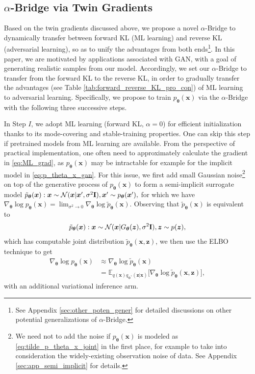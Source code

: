 \documentclass[letterpaper]{article} %
\newcommand{\beq}{\begin{equation}}
\newcommand{\eeq}{\end{equation}}
\newcommand{\bali}{\begin{aligned}}
\newcommand{\eali}{\end{aligned}}
\newcommand{\Nc}[0]{\ensuremath{\mathcal{N}} }
\newcommand{\Ebb}[0]{\ensuremath{\mathbb{E}} }
\newcommand{\Imat}[0]{\ensuremath{{\bf I}} }
\newcommand{\xv}[0]{\ensuremath{\boldsymbol{x}} }
\newcommand{\zv}[0]{\ensuremath{\boldsymbol{z}} }
\newcommand{\thetav}[0]{\ensuremath{\boldsymbol{\theta}} }
\newcommand{\phiv}[0]{\ensuremath{\boldsymbol{\phi}} }
\begin{document}
\subsection{$\alpha$-Bridge via Twin Gradients}
\label{sec:alpha_bridge}




Based on the twin gradients discussed above, we propose a novel $\alpha$-Bridge to dynamically transfer between forward KL (ML learning) and reverse KL (adversarial learning), so as to unify the advantages from both ends\footnote{See 
	Appendix \ref{sec:other_poten_gener}
	for detailed discussions on other potential generalizations of $\alpha$-Bridge.}.
In this paper, we are motivated by applications associated with GAN, with a goal of generating realistic samples from our model. Accordingly, we set our $\alpha$-Bridge to transfer from the forward KL to the reverse KL, in order to gradually transfer the advantages (see Table \ref{tab:forward_reverse_KL_pro_con}) of ML learning to adversarial learning. 
Specifically, we propose to train $p_{\thetav}(\xv)$ via the $\alpha$-Bridge with the following three successive steps. 

In Step $I$, we adopt ML learning (forward KL, $\alpha=0$) for efficient initialization thanks to its mode-covering and stable-training properties. One can skip this step if pretrained models from ML learning are available. 
From the perspective of practical implementation, one often need to approximately calculate the gradient in \eqref{eq:ML_grad}, as $p_{\thetav}(\xv)$ may be intractable for example for the implicit model in \eqref{eq:p_theta_x_gan}.
For this issue, we first add small Gaussian noise\footnote{We need not to add the noise if $p_{\thetav}(\xv)$ is modeled as \eqref{eq:tilde_p_theta_x_joint} in the first place, for example to take into consideration the widely-existing observation noise of data. See 
Appendix \ref{sec:app_semi_implicit} 
for details. } 
on top of the generative process of $p_{\thetav}(\xv)$ to form a semi-implicit surrogate model \cite{yin2018semi}
$
\tilde p_{\thetav}(\xv): \xv \sim \Nc(\xv | \xv', \sigma^2 \Imat), \xv' \sim p_{\thetav}(\xv'),
$
for which we have $\nabla_{\thetav} \log p_{\thetav}(\xv) = \lim_{\sigma^2 \to 0} \nabla_{\thetav} \log \tilde p_{\thetav}(\xv)$.
Observing that $\tilde p_{\thetav}(\xv)$ is equivalent to 
\beq\label{eq:tilde_p_theta_x_joint}
\tilde p_{\thetav}(\xv): \xv \sim \Nc(\xv | G_{\thetav}(\zv), \sigma^2 \Imat), \zv \sim p(\zv), 
\eeq
which has computable joint distribution $\tilde p_{\thetav}(\xv , \zv)$, 
we then use the ELBO technique to get 
\beq\label{eq:approx_grad_loglike}
\bali
\nabla_{\thetav} \log p_{\thetav}(\xv)
& \approx \nabla_{\thetav} \log \tilde p_{\thetav}(\xv)
\\ &
= \Ebb_{q(\xv) q_{\phiv^{*}}(\zv|\xv)} \big[
\nabla_{\thetav} \log \tilde p_{\thetav}(\xv, \zv)
\big],
\eali
\eeq
with an additional variational inference arm.
\end{document}

